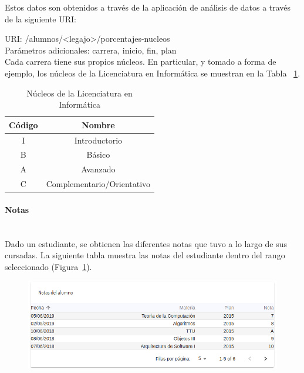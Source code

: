 Estos datos son obtenidos a través de la aplicación de análisis de datos a través de la siguiente URI:

URI: /alumnos/<legajo>/porcentajes-nucleos \\

Parámetros adicionales: carrera, inicio, fin, plan \\

Cada carrera tiene sus propios núcleos. En particular, y tomado a forma de ejemplo, los núcleos de la Licenciatura en Informática se muestran en la Tabla ~\ref{tab:tabla_nucleos}.

\begin{table}[!htbp]
    \centering
    \makegapedcells
    \begin{tabular}{|c|c|}
    \hline
    Código & Nombre \\ \hline
    I & Introductorio \\ \hline
    B & Básico\\ \hline
    A & Avanzado \\ \hline
    C & Complementario/Orientativo \\ \hline
    \end{tabular}
    \caption{Núcleos de la Licenciatura en Informática}
    \label{tab:tabla_nucleos}
\end{table}


\paragraph{Notas}\mbox{}\\

Dado un estudiante, se obtienen las diferentes notas que tuvo a lo largo de sus cursadas.
La siguiente tabla muestra las notas del estudiante dentro del rango seleccionado (Figura~\ref{fig:sa-notas}).

\begin{figure}[H]
  \centering
    \includegraphics[scale=0.4]{images/seguimiento-academico/sa-notas.png}
  \label{fig:sa-notas}
\end{figure}

